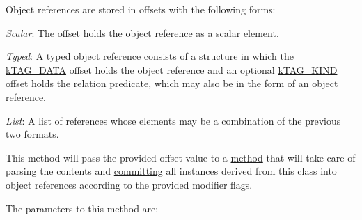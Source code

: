 Object references are stored in offsets with the following forms\-:


\begin{DoxyItemize}
\item {\itshape Scalar}\-: The offset holds the object reference as a scalar element. 
\item {\itshape Typed}\-: A typed object reference consists of a structure in which the \hyperlink{}{k\-T\-A\-G\-\_\-\-D\-A\-T\-A} offset holds the object reference and an optional \hyperlink{}{k\-T\-A\-G\-\_\-\-K\-I\-N\-D} offset holds the relation predicate, which may also be in the form of an object reference. 
\item {\itshape List}\-: A list of references whose elements may be a combination of the previous two formats. 
\end{DoxyItemize}

This method will pass the provided offset value to a \hyperlink{class_c_persistent_unit_object_ac5766758d07f7ee985fd2699b8d99fce}{method} that will take care of parsing the contents and \hyperlink{}{committing} all instances derived from this class into object references according to the provided modifier flags.

The parameters to this method are\-:



